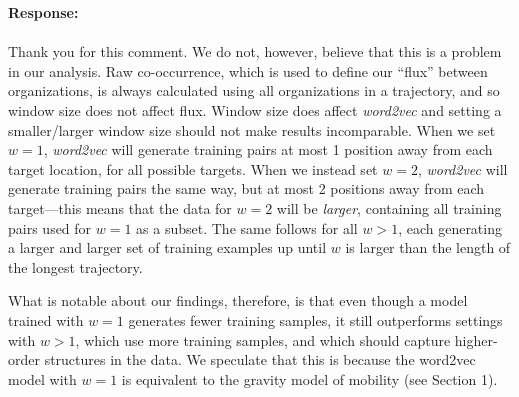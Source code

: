 \documentclass[12pt,a4paper]{article}
\newcounter{comment}[subsection]
\newcommand{\response}[1]{{\noindent \textbf{Response:} \\ \\ \noindent #1}}
\begin{document}
\response{
	Thank you for this comment.
	We do not, however, believe that this is a problem in our analysis.
	Raw co-occurrence, which is used to define our ``flux'' between organizations, is always calculated using all organizations in a trajectory, and so window size does not affect flux.
	Window size does affect \textit{word2vec} and setting a smaller/larger window size should not make results incomparable.
	When we set $w = 1$, \textit{word2vec} will generate training pairs at most 1 position away from each target location, for all possible targets.
	When we instead set $w = 2$, \textit{word2vec} will generate training pairs the same way, but at most 2 positions away from each target---this means that the data for $w = 2$ will be \textit{larger}, containing all training pairs used for $w = 1$ as a subset.
	The same follows for all $w > 1$, each generating a larger and larger set of training examples up until $w$ is larger than the length of the longest trajectory.

	What is notable about our findings, therefore, is that even though a model trained with $w = 1$ generates fewer training samples, it still outperforms settings with $w > 1$, which use more training samples, and which should capture higher-order structures in the data.
	We speculate that this is because the word2vec model with $w = 1$ is equivalent to the gravity model of mobility (see Section 1).
}
\end{document}
